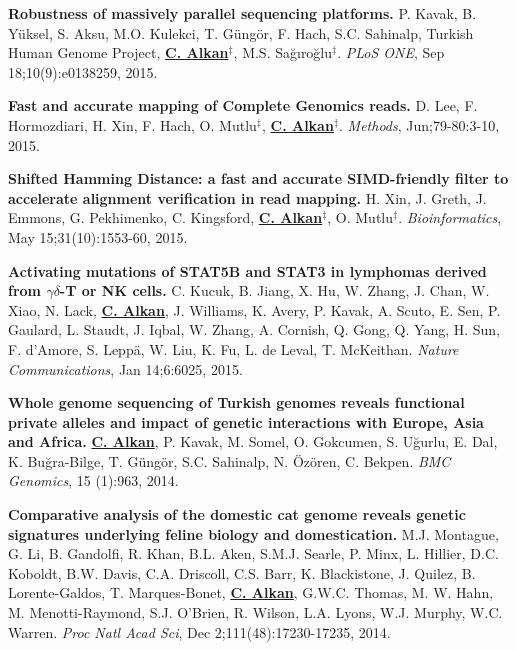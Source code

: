   \vspace{-.2cm}        
  {\bf Robustness of massively parallel sequencing platforms.}
  P. Kavak, B. Yüksel, S. Aksu, M.O. Kulekci, T. Güngör, F. Hach, S.C. Sahinalp, Turkish Human Genome Project, {\bf {\underline {C. Alkan}}}$^\ddag$,
  M.S. Sağıroğlu$^\ddag$.    
  {\em PLoS ONE},  Sep 18;10(9):e0138259, 2015.  

  \vspace{-.2cm}        
  {\bf Fast and accurate mapping of Complete Genomics reads.}
  D. Lee, F. Hormozdiari, H. Xin, F. Hach, O. Mutlu$^\ddag$,  {\bf {\underline {C. Alkan}}}$^\ddag$.
  {\em Methods}, Jun;79-80:3-10, 2015. 

  \vspace{-.2cm}        
  {\bf Shifted Hamming Distance: a fast and accurate SIMD-friendly filter to accelerate alignment verification in read mapping.} H. Xin, J. Greth, J. Emmons, 
G. Pekhimenko, C. Kingsford, {\bf {\underline{C. Alkan}}}$^\ddag$,  O. Mutlu$^\ddag$. {\em Bioinformatics},  May 15;31(10):1553-60, 2015.


  \vspace{-.2cm}        
  {\bf Activating mutations of STAT5B and STAT3 in lymphomas derived from $\gamma\delta$-T or NK cells.}
   C. Kucuk, B. Jiang, X. Hu, W. Zhang, J. Chan, W. Xiao, N. Lack,   {\bf {\underline {C. Alkan}}},  J. Williams, K. Avery, P. Kavak, A. Scuto, E. Sen,  P. Gaulard, L. Staudt, J. Iqbal,  W. Zhang,  A. Cornish, Q. Gong, Q.  Yang, H. Sun, F. d'Amore, S. Leppä, W. Liu, K. Fu, L. de Leval, T. McKeithan.
 {\em Nature Communications}, Jan 14;6:6025, 2015.

   \clearpage

  \vspace{-.2cm}        
  {\bf Whole genome sequencing of Turkish genomes reveals functional private alleles and impact of genetic interactions with Europe, Asia and Africa.}
  {\bf {\underline {C. Alkan}}}, P. Kavak, M. Somel, O. Gokcumen, S. Uğurlu, E. Dal, K. Buğra-Bilge,  T. Güngör, S.C. Sahinalp, N. Özören, C. Bekpen.
  {\em BMC Genomics}, 15 (1):963, 2014.


  \vspace{-.2cm}        
  {\bf Comparative analysis of the domestic cat genome reveals genetic signatures underlying feline biology and domestication.}
  M.J. Montague, G. Li, B. Gandolfi, R. Khan, B.L. Aken, S.M.J. Searle, P. Minx, L. Hillier, D.C. Koboldt, B.W. Davis, C.A. Driscoll, 
  C.S. Barr, K. Blackistone, J. Quilez, B. Lorente-Galdos, T. Marques-Bonet, {\bf {\underline {C. Alkan}}}, G.W.C. Thomas, M. W. Hahn, M. Menotti-Raymond, 
  S.J. O’Brien, R. Wilson, L.A. Lyons, W.J. Murphy, W.C. Warren. {\em Proc Natl Acad Sci}, Dec 2;111(48):17230-17235, 2014.


